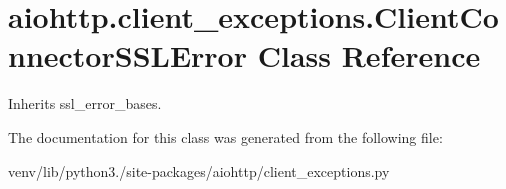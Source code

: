 \hypertarget{classaiohttp_1_1client__exceptions_1_1_client_connector_s_s_l_error}{}\section{aiohttp.\+client\+\_\+exceptions.\+Client\+Connector\+S\+S\+L\+Error Class Reference}
\label{classaiohttp_1_1client__exceptions_1_1_client_connector_s_s_l_error}


Inherits ssl\+\_\+error\+\_\+bases.



The documentation for this class was generated from the following file\+:\begin{DoxyCompactItemize}
\item 
venv/lib/python3./site-\/packages/aiohttp/client\+\_\+exceptions.\+py\end{DoxyCompactItemize}
